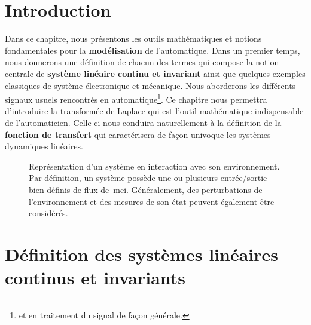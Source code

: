 \section{Introduction}
Dans ce chapitre, nous présentons les outils mathématiques
et notions fondamentales pour la \textbf{modélisation} de l'automatique.
Dans un premier temps, nous donnerons une définition de chacun 
des termes qui compose la notion centrale de \textbf{système linéaire continu et
invariant} ainsi que quelques exemples classiques de système électronique 
et mécanique.
Nous aborderons les différents signaux usuels rencontrés
en automatique\footnote{et en traitement du signal de façon générale.}.
Ce chapitre nous permettra d'introduire la transformée de Laplace qui 
est l'outil mathématique indispensable de l'automaticien.
Celle-ci nous conduira naturellement à la définition 
de la \textbf{fonction de transfert} qui caractérisera de façon univoque 
les systèmes dynamiques linéaires.
\begin{figure}[!h]
    \centering
    
    \caption{Représentation d'un système en interaction avec son environnement. 
             Par définition, un système possède une ou plusieurs entrée/sortie 
             bien définis de flux de~\gls{mei}. Généralement, des 
             perturbations de l'environnement et des mesures de son état 
             peuvent également être considérés.\label{fig-systeme}}
\end{figure}
\newpage

\captionsetup{width=0.9\linewidth,labelfont=bf}
\section[Définition SLCI]
        {Définition des systèmes linéaires continus et invariants}
